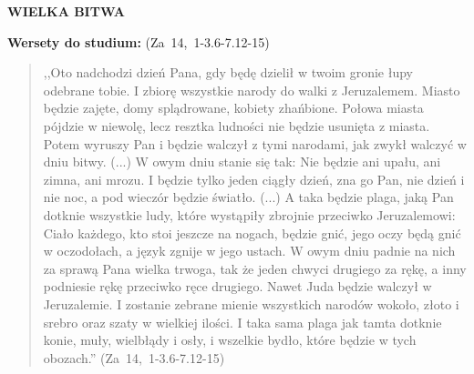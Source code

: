 \documentclass[10pt,a4paper,oneside]{article}
\begin{document}
\centerline{\textbf{\MakeUppercase{Wielka bitwa}}}
\begin{center}
\textbf{Wersety do studium:} (Za~14,~1-3.6-7.12-15)
\end{center}
\begin{quote}
,,Oto nadchodzi dzień Pana, gdy będę dzielił w twoim gronie łupy odebrane tobie. I zbiorę wszystkie narody do walki z Jeruzalemem. Miasto będzie zajęte, domy splądrowane, kobiety zhańbione. Połowa miasta pójdzie w niewolę, lecz resztka ludności nie będzie usunięta z miasta. Potem wyruszy Pan i będzie walczył z tymi narodami, jak zwykł walczyć w dniu bitwy. (...) W owym dniu stanie się tak: Nie będzie ani upału, ani zimna, ani mrozu. I będzie tylko jeden ciągły dzień, zna go Pan, nie dzień i nie noc, a pod wieczór będzie światło. (...) A taka będzie plaga, jaką Pan dotknie wszystkie ludy, które wystąpiły zbrojnie przeciwko Jeruzalemowi: Ciało każdego, kto stoi jeszcze na nogach, będzie gnić, jego oczy będą gnić w oczodołach, a język zgnije w jego ustach. W owym dniu padnie na nich za sprawą Pana wielka trwoga, tak że jeden chwyci drugiego za rękę, a inny podniesie rękę przeciwko ręce drugiego. Nawet Juda będzie walczył w Jeruzalemie. I zostanie zebrane mienie wszystkich narodów wokoło, złoto i srebro oraz szaty w wielkiej ilości. I taka sama plaga jak tamta dotknie konie, muły, wielbłądy i osły, i wszelkie bydło, które będzie w tych obozach.'' (Za~14,~1-3.6-7.12-15)
\end{quote}
\end{document}
